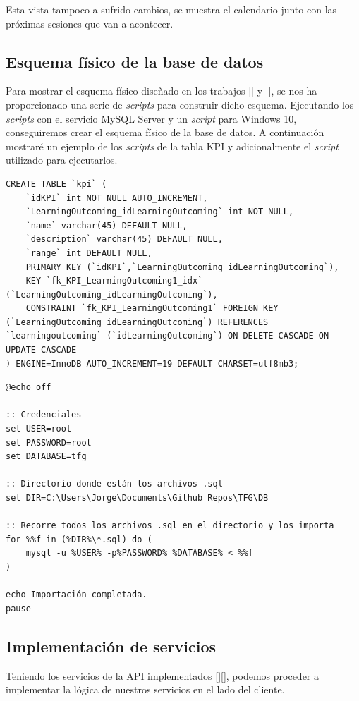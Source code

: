 Esta vista tampoco a sufrido cambios, se muestra el calendario junto con las próximas sesiones que van a acontecer.
\subsection{Esquema físico de la base de datos}
Para mostrar el esquema físico diseñado en los trabajos [\cite{TFG_Daniel}] y [\cite{TFG_Sergio}], se nos ha proporcionado una serie de \textit{scripts} para construir dicho esquema. Ejecutando los \textit{scripts} con el servicio MySQL Server y un \textit{script} para Windows 10, conseguiremos crear el esquema físico de la base de datos.
A continuación mostraré un ejemplo de los \textit{scripts} de la tabla KPI y adicionalmente el \textit{script} utilizado para ejecutarlos.

\begin{lstlisting}[style=Consola, caption={Script para crear la tabla kpi},label=Consola_code_ script_kpi]
CREATE TABLE `kpi` (
	`idKPI` int NOT NULL AUTO_INCREMENT,
  	`LearningOutcoming_idLearningOutcoming` int NOT NULL,
  	`name` varchar(45) DEFAULT NULL,
  	`description` varchar(45) DEFAULT NULL,
  	`range` int DEFAULT NULL,
  	PRIMARY KEY (`idKPI`,`LearningOutcoming_idLearningOutcoming`),
  	KEY `fk_KPI_LearningOutcoming1_idx` (`LearningOutcoming_idLearningOutcoming`),
  	CONSTRAINT `fk_KPI_LearningOutcoming1` FOREIGN KEY (`LearningOutcoming_idLearningOutcoming`) REFERENCES `learningoutcoming` (`idLearningOutcoming`) ON DELETE CASCADE ON UPDATE CASCADE
) ENGINE=InnoDB AUTO_INCREMENT=19 DEFAULT CHARSET=utf8mb3;
\end{lstlisting}

\begin{lstlisting}[style=Consola, caption={Script ejecutar todos los scripts},label=Consola_code_ script_windows]
@echo off

:: Credenciales
set USER=root
set PASSWORD=root
set DATABASE=tfg

:: Directorio donde están los archivos .sql
set DIR=C:\Users\Jorge\Documents\Github Repos\TFG\DB

:: Recorre todos los archivos .sql en el directorio y los importa
for %%f in (%DIR%\*.sql) do (
    mysql -u %USER% -p%PASSWORD% %DATABASE% < %%f
)

echo Importación completada.
pause
\end{lstlisting}

\subsection{Implementación de servicios}
Teniendo los servicios de la API implementados [\cite{TFG_Sergio}][\cite{TFG_Daniel}], podemos proceder a implementar la lógica de nuestros servicios en el lado del cliente.


